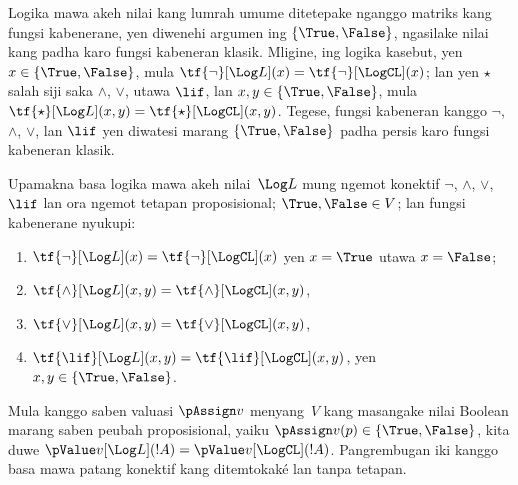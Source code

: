 \documentclass[../../../include/open-logic-section]{subfiles}
\begin{document}


Logika mawa akeh nilai kang lumrah umume ditetepake nganggo matriks
kang fungsi kabenerane, yen diwenehi argumen ing $\{\True, \False\}$,
ngasilake nilai kang padha karo fungsi kabeneran klasik. Mligine,
ing logika kasebut, yen $x \in \{\True, \False\}$, mula
$\tf{\lnot}[\Log L](x) = \tf{\lnot}[\LogCL](x)$; lan yen
$\star$ salah siji saka $\land$, $\lor$, utawa $\lif$,
lan $x, y \in \{\True, \False\}$, mula
$\tf{\star}[\Log L](x,y) = \tf{\star}[\LogCL](x,y)$.
Tegese, fungsi kabeneran kanggo $\lnot$, $\land$, $\lor$,
lan $\lif$ yen diwatesi marang $\{\True,\False\}$
padha persis karo fungsi kabeneran klasik.

\begin{prop}
  Upamakna basa logika mawa akeh nilai~$\Log L$ mung ngemot
  konektif $\lnot$, $\land$, $\lor$, $\lif$ lan ora ngemot
  tetapan proposisional; $\True, \False \in V$; lan fungsi
  kabenerane nyukupi:
  \begin{enumerate}
    \item{} $\tf{\lnot}[\Log L](x) = \tf{\lnot}[\LogCL](x)$ yen $x =
    \True$ utawa $x = \False$;
    \item{} $\tf{\land}[\Log L](x,y) = \tf{\land}[\LogCL](x,y)$,
    \item{} $\tf{\lor}[\Log L](x,y) = \tf{\lor}[\LogCL](x,y)$,
    \item{} $\tf{\lif}[\Log L](x,y) = \tf{\lif}[\LogCL](x,y)$,
    yen $x, y \in \{\True, \False\}$.
  \end{enumerate}
  Mula kanggo saben valuasi $\pAssign v$ menyang~$V$ kang masangake
  nilai Boolean marang saben peubah proposisional, yaiku
  $\pAssign v(p) \in \{\True,\False\}$, kita duwe
  $\pValue v[\Log L](!A) = \pValue v[\LogCL](!A)$.
Pangrembugan iki kanggo basa mawa patang konektif kang ditemtokaké lan tanpa tetapan.
\end{prop}
\end{document}
